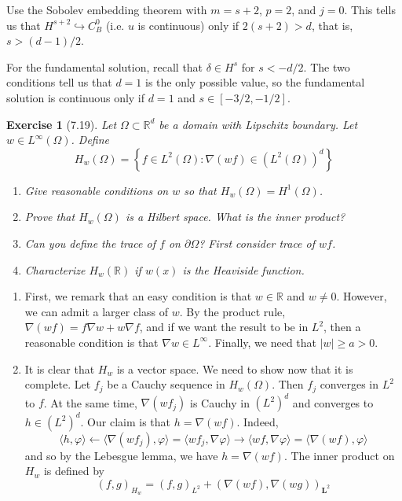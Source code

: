 \documentclass[letterpaper,twoside,11pt]{article}
\theoremstyle{mystyle}
\newtheorem*{exercise}{Exercise}
\newcommand{\R}{{\mathbb R}}
\begin{document}
Use the Sobolev embedding theorem with $m = s+2$, $p = 2$, and $j = 0$. This tells us that $H^{s+2} \hookrightarrow C_B^0$ (i.e. $u$ is continuous) only if $2(s+2) > d$, that is, $s > (d-1)/2$.

For the fundamental solution, recall that $\delta \in H^s$ for $s < -d/2$. The two conditions tell us that $ d = 1$ is the only possible value, so the fundamental solution is continuous only if $d = 1$ and $s \in [-3/2, -1/2]$. 




\begin{exercise}[7.19]
  Let $\Omega \subset \R^d$ be a domain with Lipschitz boundary. Let $w\in L^\infty \left( \Omega \right)$. Define 
  \[H_w\left( \Omega \right) = \left\{f \in L^2 (\Omega) : \nabla \left( wf \right) \in \left( L^2(\Omega) \right)^d\right\}\]
\begin{enumerate}
  \item Give reasonable conditions on $w$ so that $H_w\left( \Omega \right) = H^1 \left( \Omega \right)$. 
  \item Prove that $H_w\left( \Omega \right)$ is a Hilbert space. What is the inner product? 
  \item Can you define the trace of $f$ on $\partial \Omega$? First consider trace of $wf$. 
  \item Characterize $H_w\left( \R \right)$ if $w(x)$ is the Heaviside function. 
\end{enumerate}
\end{exercise}


\begin{enumerate}
  \item First, we remark that an easy condition is that $w \in \R$ and $w \neq 0$. However, we can admit a larger class of $w$. By the product rule, $\nabla(wf) = f\nabla w + w \nabla f$, and if we want the result to be in $L^2$, then a reasonable condition is that $\nabla w \in L^\infty$. Finally, we need that $|w|\geq a > 0$. 
  \item It is clear that $H_w$ is a vector space. We need to show now that it is complete. Let $f_j$ be a Cauchy sequence in $H_w\left( \Omega \right)$. Then $f_j$ converges in $L^2$ to $f$. At the same time, $\nabla (wf_j)$ is Cauchy in $\left( L^2 \right)^d$ and converges to $h \in \left( L^2 \right)^d$. Our claim is that $h = \nabla \left( wf \right)$. Indeed, 
  \[\langle h, \varphi \rangle \leftarrow \langle \nabla (wf_j) , \varphi \rangle = \langle wf_j, \nabla \varphi \rangle \to \langle wf, \nabla \varphi \rangle = \langle \nabla (wf) , \varphi \rangle \]
  and so by the Lebesgue lemma, we have $h = \nabla (wf)$. The inner product on $H_w$ is defined by 
  \[(f, g)_{H_w} = (f, g)_{L^2} + (\nabla (wf), \nabla (wg))_{\bm L^2}\]

\end{enumerate}
\end{document}
